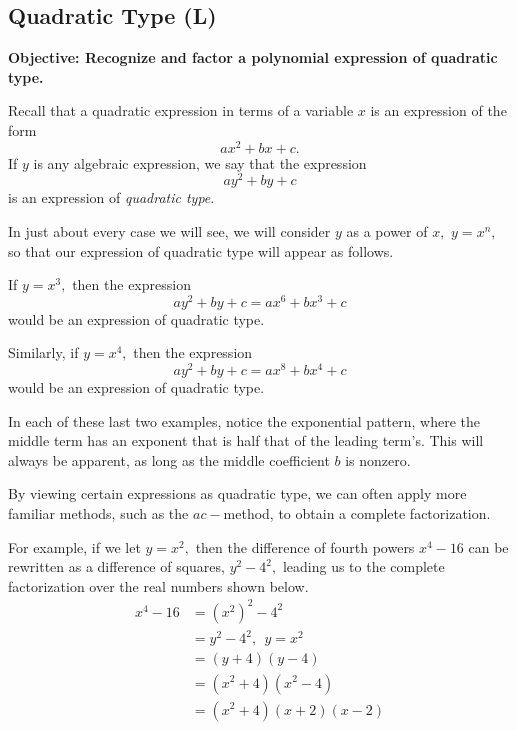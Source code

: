 \documentclass[12pt]{book}
\theoremstyle{definition}
\begin{document}
\subsection{Quadratic Type (L)}
{\bf Objective: Recognize and factor a polynomial expression of quadratic type.}\par
Recall that a quadratic expression in terms of a variable $x$ is an expression of the form $$ax^2+bx+c.$$
If $y$ is any algebraic expression, we say that the expression $$ay^2+by+c$$ is an expression of {\it quadratic type}.
\par
In just about every case we will see, we will consider $y$ as a power of $x,$ $y=x^n,$ so that our expression of quadratic type will appear as follows.
\begin{center}
\end{center}
If $y=x^3,$ then the expression $$ay^2+by+c=ax^6+bx^3+c$$
would be an expression of quadratic type.
\par
Similarly, if $y=x^4,$ then the expression $$ay^2+by+c=ax^8+bx^4+c$$
would be an expression of quadratic type.
\par
In each of these last two examples, notice the exponential pattern, where the middle term has an exponent that is half that of the leading term's.  This will always be apparent, as long as the middle coefficient $b$ is nonzero.
\par
By viewing certain expressions as quadratic type, we can often apply more familiar methods, such as the $ac-$method, to obtain a complete factorization.
\par
For example, if we let $y=x^2,$ then the difference of fourth powers $x^4-16$ can be rewritten as a difference of squares,
$y^2-4^2,$ leading us to the complete factorization over the real numbers shown below.
\begin{equation*}
	\begin{split}
		x^4-16&=\left(x^2\right)^2-4^2\\
		&=y^2-4^2, \ \ y=x^2\\
		&=\left(y+4\right)\left(y-4\right)\\
		&=\left(x^2+4\right)\left(x^2-4\right)\\
		&=\left(x^2+4\right)\left(x+2\right)\left(x-2\right)
	\end{split}
\end{equation*}
\end{document}
